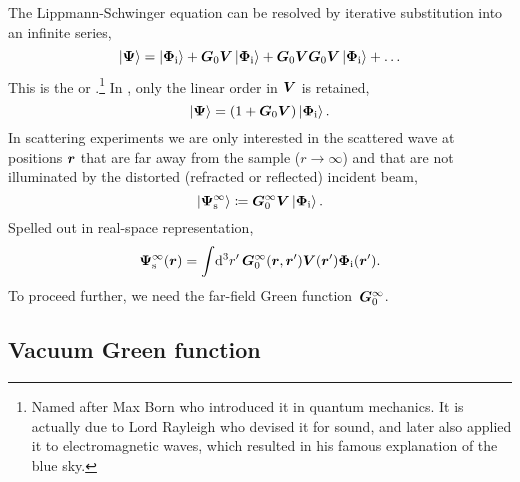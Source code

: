 The Lippmann-Schwinger equation can be resolved by iterative substitution
into an infinite series,
\begin{equation}\label{E1BornSeries}
  \ket{\v\Psi}
  = \ket{\v\Phi_\si}
  + \TGo\TV \ket{\v\Phi_\si}
  + \TGo\TV \TGo\TV  \ket{\v\Phi_\si}
 + \ldots
\end{equation}
%
%
This is the  or .\footnote
{Named after Max Born who introduced it in quantum mechanics.
It is actually due to Lord Rayleigh who devised it for sound,
and later also applied it to electromagnetic waves,
which resulted in his famous explanation of the blue sky.}
In ,
%
only the linear order in $\bm{V}$ is retained,
\begin{equation}\label{E1Born1}
  \ket{\v\Psi}
  = (1 + \TGo\TV) \ket{\v\Phi_\si}.
\end{equation}
In scattering experiments we are only interested in the scattered
wave at positions $\bm{r}$ that are far away from the sample ($r\to\infty$)
and that are not illuminated by the distorted (refracted or reflected) incident beam,
%
%
\begin{equation}\label{E1BornS}
  \ket{\v\Psi^\infty_\text{s}}
  \coloneqq \TGo^\infty\TV\ket{\v\Phi_\si}.
\end{equation}
%
%
Spelled out in real-space representation,
\begin{equation}\label{E1PsiS}
  \v\Psi_\text{s}^\infty(\r)
  = \int\!\d^3r'\,\TGo^\infty(\r,\r')\TV(\r')\v\Phi_\si(\r').
\end{equation}
To proceed further,
we need the far-field Green function~$\bm{G}_0^\infty$.

\subsection{Vacuum Green function}\label{SvacGreen}

